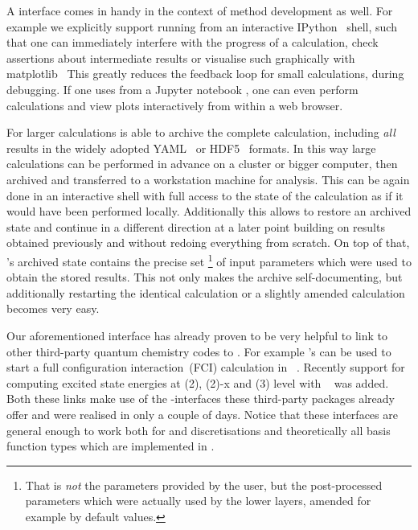 A \python interface comes in handy in the context of method development as well.
For example we explicitly support running \molsturm from an interactive
IPython~ shell,
such that one can immediately interfere with the progress of a calculation,
check assertions about intermediate results
or visualise such graphically with matplotlib~\cite{Matplotlib}
This greatly reduces the feedback loop for small calculations,
\eg during debugging.
If one uses \molsturm from a Jupyter notebook \cite{Jupyter},
one can even perform calculations and view plots
interactively from within a web browser.

For larger calculations \molsturm is able to archive the complete
calculation,
including \emph{all} \SCF results in
the widely adopted YAML~\cite{YAML} or HDF5~\cite{HDF5Manual} formats.
In this way large calculations can be performed in advance
on a cluster or bigger computer,
then archived and transferred to a workstation machine
for analysis.
This can be again done in an interactive shell
with full access to the state of the calculation
as if it would have been performed locally.
Additionally this allows to restore an archived state
and continue in a different direction at a later point
building on results obtained previously
and without redoing everything from scratch.
On top of that, \molsturm's archived state contains
the precise set%
\footnote{That is \emph{not} the parameters provided by the user,
but the post-processed parameters which were actually used
by the lower layers, amended for example by default values.}
of input parameters which were used to obtain the stored results.
This not only makes the archive self-documenting,
but additionally restarting the identical calculation
or a slightly amended calculation becomes very easy.

Our aforementioned \numpy interface has already proven to be very helpful
to link to other third-party quantum chemistry codes to \molsturm.
For example \molsturm's \SCF can be used to start a
full configuration interaction~(FCI) calculation
in \pyscf~\cite{Sun2017}.
Recently support for computing excited state energies at {\ADC}(2),
{\ADC}(2)-x and {\ADC}(3) \cite{Schirmer1982,Trofimov1999} level
with \adcman~\cite{Wormit2014} was added.
Both these links make use of the \python-\numpy interfaces
these third-party packages already offer and were realised in only a couple of days.
Notice that these interfaces
are general enough to work both for \CS and \cGTO discretisations
and theoretically all basis function types which are implemented in \gint.

